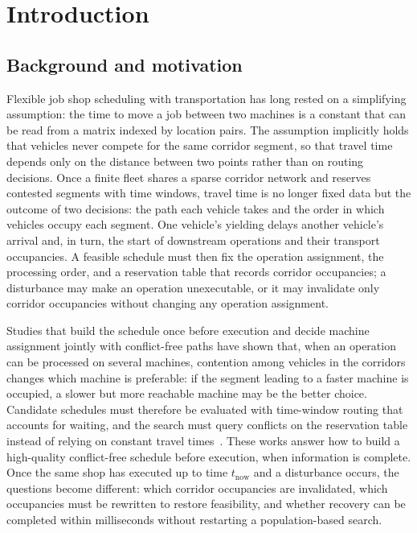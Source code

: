 \documentclass[manuscript,screen,review]{acmart}
\begin{document}
\maketitle

\section{Introduction}
\label{sec:introduction}

\subsection{Background and motivation}

Flexible job shop scheduling with transportation has long rested on a simplifying assumption: the time to move a job between two machines is a constant that can be read from a matrix indexed by location pairs.
The assumption implicitly holds that vehicles never compete for the same corridor segment, so that travel time depends only on the distance between two points rather than on routing decisions.
Once a finite fleet shares a sparse corridor network and reserves contested segments with time windows, travel time is no longer fixed data but the outcome of two decisions: the path each vehicle takes and the order in which vehicles occupy each segment.
One vehicle's yielding delays another vehicle's arrival and, in turn, the start of downstream operations and their transport occupancies.
A feasible schedule must then fix the operation assignment, the processing order, and a reservation table that records corridor occupancies; a disturbance may make an operation unexecutable, or it may invalidate only corridor occupancies without changing any operation assignment.

Studies that build the schedule once before execution and decide machine assignment jointly with conflict-free paths have shown that,
when an operation can be processed on several machines, contention among vehicles in the corridors changes which machine is preferable: if the segment leading to a faster machine is occupied, a slower but more reachable machine may be the better choice.
Candidate schedules must therefore be evaluated with time-window routing that accounts for waiting, and the search must query conflicts on the reservation table
instead of relying on constant travel times~\cite{vanos2026exact,li2026framework,sun2023integrated}.
These works answer how to build a high-quality conflict-free schedule before execution, when information is complete. Once the same shop has executed up to time \(t_{\mathrm{now}}\) and a disturbance occurs,
the questions become different: which corridor occupancies are invalidated, which occupancies must be rewritten to restore feasibility, and whether recovery can be completed within milliseconds without restarting a population-based search.
\end{document}
